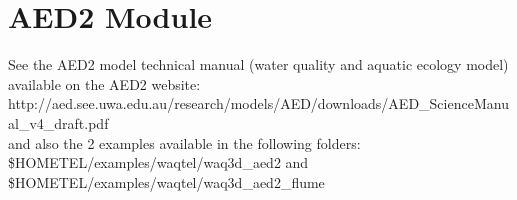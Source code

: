 \chapter{AED2 Module}

See the AED2 model technical manual (water quality and aquatic ecology model)
available on the AED2 website:\\

http://aed.see.uwa.edu.au/research/models/AED/downloads/AED\_ScienceManual\_v4\_draft.pdf
\\

and also the 2 examples available in the following folders:\\

\$HOMETEL/examples/waqtel/waq3d\_aed2 and \$HOMETEL/examples/waqtel/waq3d\_aed2\_flume
